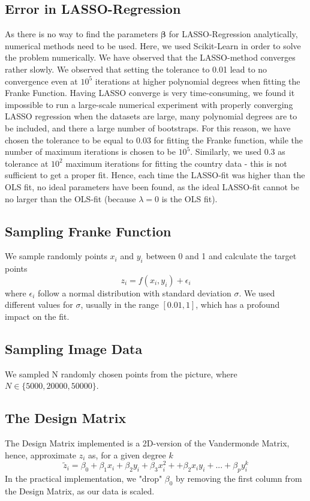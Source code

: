 \documentclass[11pt,a4paper,titlepage]{article}
\begin{document}
\subsection{Error in LASSO-Regression}
As there is no way to find the parameters $\bm{\beta}$ for LASSO-Regression analytically, numerical methods need to be used. Here, we used Scikit-Learn \cite{scikit-learn} in order to solve the problem numerically. We have observed that the LASSO-method converges rather slowly. We observed that setting the tolerance to 0.01 lead to no convergence even at $10^5$ iterations at higher polynomial degrees when fitting the Franke Function. Having LASSO converge is very time-consuming, we found it impossible to run a large-scale numerical experiment with properly converging LASSO regression when the datasets are large, many polynomial degrees are to be included, and there a large number of bootstraps. For this reason, we have chosen the tolerance to be equal to 0.03 for fitting the Franke function, while the number of maximum iterations is chosen to be $10^5$.  Similarly, we used 0.3 as tolerance at $10^2$ maximum iterations for fitting the country data - this is not sufficient to get a proper fit.  Hence, each time the LASSO-fit was higher than the OLS fit, no ideal parameters have been found, as the ideal LASSO-fit cannot be no larger than the OLS-fit (because $\lambda=0$ is the OLS fit).
\subsection{Sampling Franke Function}
We sample randomly points $x_i$ and $y_i$ between 0 and 1 and calculate the target points
\begin{equation*}
z_i=f(x_i,y_i)+\epsilon_i
\end{equation*}
where $\epsilon_i$ follow a normal distribution with standard deviation $\sigma$. We used different values for $\sigma$, usually in the range $[0.01,1]$, which has a profound impact on the fit. 
\subsection{Sampling Image Data}
We sampled N randomly chosen points from the picture, where $N \in \{5000, 20000, 50000 \}$.
\subsection{The Design Matrix}
The Design Matrix implemented is a 2D-version of the Vandermonde Matrix, hence, approximate $z_i$ as, for a given degree $k$
\begin{equation*}
\tilde z_i=\beta_0+\beta_1x_i+\beta_2y_i+\beta_3x_i^2++\beta_2x_iy_i+...+\beta_py_i^k
\end{equation*}
In the practical implementation, we "drop" $\beta_0$ by removing the first column from the Design Matrix, as our data is scaled.
\end{document}

